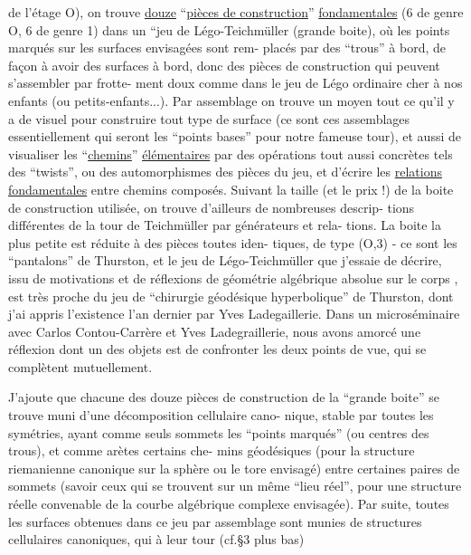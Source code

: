 
de l'étage O), on trouve \uline{douze} ``\uline{pièces de construction}'' \uline{fondamentales}
(6 de genre O, 6 de genre 1) dans un ``jeu de Légo-Teichmüller (grande
boite), où les points marqués sur les surfaces envisagées sont rem-%
placés par des ``trous'' à bord, de façon à avoir des surfaces à bord,
donc des pièces de construction qui peuvent s'assembler par frotte-%
ment doux comme dans le jeu de Légo ordinaire cher à nos enfants
(ou petits-enfants...). Par assemblage on trouve un moyen tout ce
qu'il y a de visuel pour construire tout type de surface (ce sont
ces assemblages essentiellement qui seront les ``points bases'' pour
notre fameuse tour), et aussi de visualiser les ``\uline{chemins}'' \uline{élémentaires}
par des opérations tout aussi concrètes tels des ``twists'', ou des
automorphismes des pièces du jeu, et d'écrire les \uline{relations fondamentales}
entre chemins composés. Suivant la taille (et le prix !) de la boite
de construction utilisée, on trouve d'ailleurs de nombreuses descrip-%
tions différentes de la tour de Teichmüller par générateurs et rela-%
tions. La boite la plus petite est réduite à des pièces toutes iden-%
tiques, de type (O,3) - ce sont les ``pantalons'' de Thurston, et le
jeu de Légo-Teichmüller que j'essaie de décrire, issu de motivations
et de réflexions de géométrie algébrique absolue sur le corps ,
est très proche du jeu de ``chirurgie géodésique hyperbolique'' de
Thurston, dont j'ai appris l'existence l'an dernier par Yves Ladegaillerie.
Dans un microséminaire avec Carlos Contou-Carrère et Yves Ladegraillerie,
nous avons amorcé une réflexion dont un des objets est de confronter
les deux points de vue, qui se complètent mutuellement.

J'ajoute que chacune des douze pièces de construction de
la ``grande boite'' se trouve muni d'une décomposition cellulaire cano-%
nique, stable par toutes les symétries, ayant comme seuls sommets les
``points marqués'' (ou centres des trous), et comme arètes certains che-%
mins géodésiques (pour la structure riemanienne canonique sur la sphère
ou le tore envisagé) entre certaines paires de sommets (savoir ceux
qui se trouvent sur un même ``lieu réel'', pour une structure réelle
convenable de la courbe algébrique complexe envisagée). Par suite,
toutes les surfaces obtenues dans ce jeu par assemblage sont munies
de structures cellulaires canoniques, qui à leur tour (cf.§3 plus bas)

